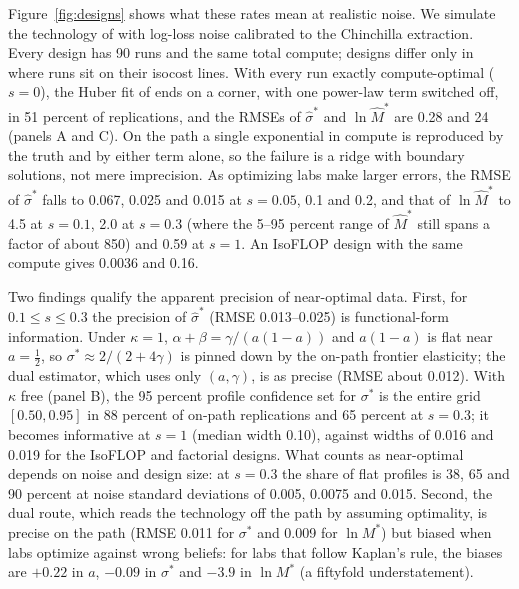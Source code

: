 Figure~\ref{fig:designs} shows what these rates mean at realistic noise. We simulate the technology of
\citet{besiroglu2024chinchilla} with log-loss noise calibrated to the Chinchilla extraction. Every design has 90 runs and
the same total compute; designs differ only in where runs sit on their isocost lines. With every run exactly
compute-optimal ($s=0$), the Huber fit of \citet{hoffmann2022training} ends on a corner, with one power-law term
switched off, in 51 percent of replications, and the RMSEs of $\hat\sigma^*$ and $\ln\hat M^*$ are 0.28 and 24
(panels A and C). On the path a single exponential in compute is reproduced by the truth and by either term alone, so
the failure is a ridge with boundary solutions, not mere imprecision. As optimizing labs make larger errors, the RMSE of
$\hat\sigma^*$ falls to 0.067, 0.025 and 0.015 at $s=0.05$, 0.1 and 0.2, and that of $\ln\hat M^*$ to 4.5 at $s=0.1$,
2.0 at $s=0.3$ (where the 5--95 percent range of $\hat M^*$ still spans a factor of about 850) and 0.59 at $s=1$. An
IsoFLOP design with the same compute gives 0.0036 and 0.16.

Two findings qualify the apparent precision of near-optimal data. First, for $0.1\le s\le0.3$ the precision of
$\hat\sigma^*$ (RMSE 0.013--0.025) is functional-form information. Under $\kappa=1$, $\alpha+\beta=\gamma/(a(1-a))$ and
$a(1-a)$ is flat near $a=\tfrac12$, so $\sigma^*\approx2/(2+4\gamma)$ is pinned down by the on-path frontier elasticity;
the dual estimator, which uses only $(a,\gamma)$, is as precise (RMSE about 0.012). With $\kappa$ free (panel B), the
95 percent profile confidence set for $\sigma^*$ is the entire grid $[0.50,0.95]$ in 88 percent of on-path replications
and 65 percent at $s=0.3$; it becomes informative at $s=1$ (median width 0.10), against widths of 0.016 and 0.019 for
the IsoFLOP and factorial designs. What counts as near-optimal depends on noise and design size: at $s=0.3$ the share
of flat profiles is 38, 65 and 90 percent at noise standard deviations of 0.005, 0.0075 and 0.015. Second, the dual
route, which reads the technology off the path by assuming optimality, is precise on the path (RMSE 0.011 for
$\sigma^*$ and 0.009 for $\ln M^*$) but biased when labs optimize against wrong beliefs: for labs that follow Kaplan's
rule, the biases are $+0.22$ in $a$, $-0.09$ in $\sigma^*$ and $-3.9$ in $\ln M^*$ (a fiftyfold understatement).

